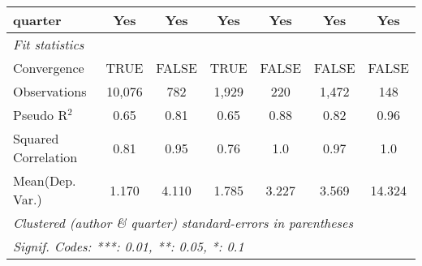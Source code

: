 \begin{tabular}{lcccccc}
   quarter                                                    & Yes           & Yes           & Yes           & Yes           & Yes           & Yes\\  
   \midrule
   \emph{Fit statistics}\\
   Convergence                                                &TRUE           & FALSE         & TRUE          & FALSE         & FALSE         & FALSE\\  
   Observations                                               & 10,076        & 782           & 1,929         & 220           & 1,472         & 148\\  
   Pseudo R$^2$                                               & 0.65          & 0.81          & 0.65          & 0.88          & 0.82          & 0.96\\  
   Squared Correlation                                        & 0.81          & 0.95          & 0.76          & 1.0           & 0.97          & 1.0\\  
Mean(Dep. Var.) & 1.170 & 4.110 & 1.785 & 3.227 & 3.569 & 14.324 \\
   \midrule \midrule
   \multicolumn{7}{l}{\emph{Clustered (author \& quarter) standard-errors in parentheses}}\\
   \multicolumn{7}{l}{\emph{Signif. Codes: ***: 0.01, **: 0.05, *: 0.1}}\\
\end{tabular}
\par\endgroup
